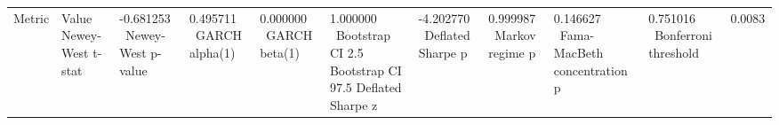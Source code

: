 \begin{tabular}{ll}
\toprule
Metric & Value \
\midrule
Newey-West t-stat & -0.681253 \
Newey-West p-value & 0.495711 \
GARCH alpha(1) & 0.000000 \
GARCH beta(1) & 1.000000 \
Bootstrap CI 2.5%
Bootstrap CI 97.5%
Deflated Sharpe z & -4.202770 \
Deflated Sharpe p & 0.999987 \
Markov regime p & 0.146627 \
Fama-MacBeth concentration p & 0.751016 \
Bonferroni threshold & 0.0083 \
\bottomrule
\end{tabular}
